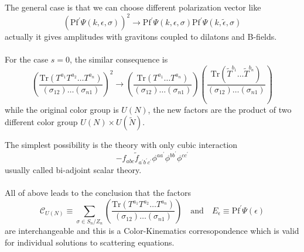 \documentclass{beamer}
\begin{document}
\begin{frame}
    The general case is that we can choose different polarization vector like 
    \begin{equation*}
        \left(\mathrm{Pf}^\prime \Psi(k,\epsilon,\sigma)\right)^2\to\mathrm{Pf}^\prime \Psi(k,\epsilon,\sigma)\mathrm{Pf}^\prime \Psi(k,\tilde{\epsilon},\sigma)
    \end{equation*}
    actually it gives amplitudes with gravitons coupled to dilatons and B-fields.
    \\ \hspace*{\fill}\\
    \pause
    For the case $s=0$, the similar consequence is 
    \begin{equation*}
        \left(\frac{\mathrm{Tr}(T^{a_1}T^{a_2}\dots T^{a_n})}{(\sigma_{12})\dots (\sigma_{n1})}\right)^2\to\left(\frac{\mathrm{Tr}(T^{a_1}\dots T^{a_n})}{(\sigma_{12})\dots (\sigma_{n1})}\right)
        \left(\frac{\mathrm{Tr}(\tilde{T}^{b_1}\dots \tilde{T}^{b_n})}{(\sigma_{12})\dots (\sigma_{n1})}\right)
    \end{equation*}
    while the original color group is $U(N)$, the new factors are the product of two different color group \alert{$U(N)\times U(\tilde{N})$}.
\end{frame}
\begin{frame}
    The simplest possibility is the theory with only cubic interaction
    \begin{equation*}
        -f_{abc}\tilde{f}_{a^\prime b^\prime c^\prime}\phi^{aa^\prime}\phi^{bb^\prime}\phi^{cc^\prime}
    \end{equation*}
    usually called bi-adjoint scalar theory.
    \\ \hspace*{\fill}\\
    All of above leads to the conclusion that the factors 
    \begin{equation*}
        \mathcal{C}_{U(N)}\equiv \sum_{\sigma\in S_n/Z_n}\left(\frac{\mathrm{Tr}(T^{a_1}T^{a_2}\dots T^{a_n})}{(\sigma_{12})\dots (\sigma_{n1})}\right)\quad \mathrm{and} \quad E_\epsilon\equiv\mathrm{Pf}^{'}\Psi(\epsilon)
    \end{equation*}
    are interchangeable and this is a Color-Kinematics corresopondence which is valid for individual solutions to scattering equations.
   
\end{frame}
\end{document}
